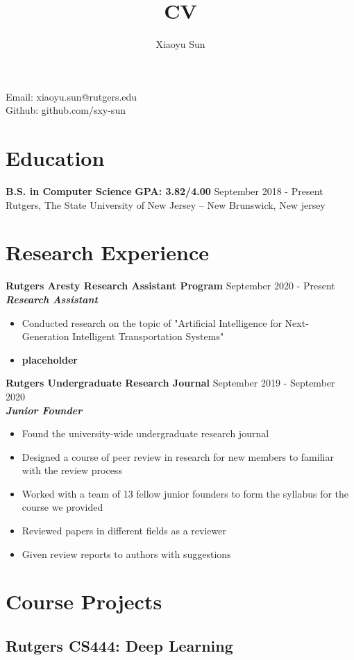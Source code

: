 \documentclass{article}
\makeatletter
\renewcommand{\maketitle}{
\begin{center}
{\huge\bfseries
\theauthor}

\vspace{.25em}

Email: xiaoyu.sun@rutgers.edu\\
Github: github.com/sxy-sun
\end{center}
}
\makeatother
\begin{document}
\title{CV}
\author{Xiaoyu Sun}
\maketitle

\section{Education}
\textbf{B.S. in Computer Science} \space \textbf{GPA: 3.82/4.00}
\hfill{September 2018 - Present}\\
Rutgers, The State University of New Jersey – New Brunswick, New jersey

\section{Research Experience}
\textbf{Rutgers Aresty Research Assistant Program}
\hfill{September 2020 - Present}\\
\textit{\textbf{Research Assistant}}
\begin{itemize}
  \itemsep0em
  \item Conducted research on the topic of "Artificial Intelligence for Next-Generation Intelligent Transportation Systems"\\
  \item \textbf{placeholder}
\end{itemize}

\noindent \textbf{Rutgers Undergraduate Research Journal}
\hfill{September 2019 - September 2020}\\
\textit{\textbf{Junior Founder}}
\begin{itemize}
  \itemsep0em
  \item Found the university-wide undergraduate research journal
  \item Designed a course of peer review in research for new members to familiar with the
review process
  \item  Worked with a team of 13 fellow junior founders to form the syllabus for the course we
provided
  \item Reviewed papers in different fields as a reviewer
  \item Given review reports to authors with suggestions
\end{itemize}


\section{Course Projects}
\subsection*{Rutgers CS444: Deep Learning}
\end{document}
